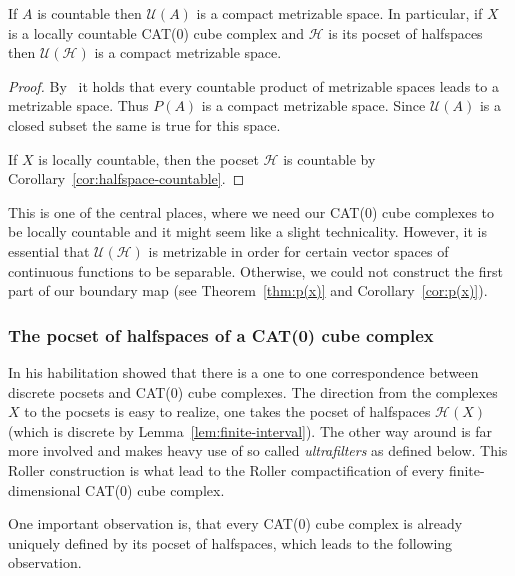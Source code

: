 \begin{cor}
  \label{cor:comp-met}
  If \(A\) is countable then \(\mathcal{U}(A)\) is a compact metrizable space. In particular, if \(X\) is a locally countable CAT(0) cube complex and \(\mathcal{H}\) is its pocset of halfspaces then \(\mathcal{U}(\mathcal{H})\) is a compact metrizable space.
\end{cor}

\begin{proof}
  By~\textcite[Theorem~4.2.2]{Engelking} it holds that every countable product of metrizable spaces leads to a metrizable space. Thus \(P(A)\) is a compact metrizable space. Since \(\mathcal{U}(A)\) is a closed subset the same is true for this space.

  If \(X\) is locally countable, then the pocset \(\mathcal{H}\) is countable by Corollary~\ref{cor:halfspace-countable}.
\end{proof}

\begin{rem}
  This is one of the central places, where we need our CAT(0) cube complexes to be locally countable and it might seem like a slight technicality. However, it is essential that \(\mathcal{U}(\mathcal{H})\) is metrizable in order for certain vector spaces of continuous functions to be separable. Otherwise, we could not construct the first part of our boundary map (see Theorem~\ref{thm:p(x)} and Corollary~\ref{cor:p(x)}).
\end{rem}

\subsubsection*{The pocset of halfspaces of a CAT(0) cube complex}
\label{pocset-halfspaces}

\begin{rem}
  \label{rem:roller}
  In his habilitation \textcite{Roller1999} showed that there is a one to one correspondence between discrete pocsets and CAT(0) cube complexes. The direction from the complexes \(X\) to the pocsets is easy to realize, one takes the pocset of halfspaces \(\mathcal{H}(X)\) (which is discrete by Lemma~\ref{lem:finite-interval}). The other way around is far more involved and makes heavy use of so called \emph{ultrafilters} as defined below. This Roller construction is what lead to the Roller compactification of every finite-dimensional CAT(0) cube complex.

  One important observation is, that every CAT(0) cube complex is already uniquely defined by its pocset of halfspaces, which leads to the following observation.
\end{rem}

